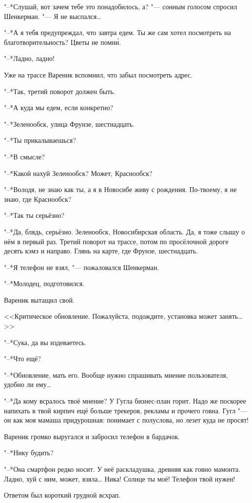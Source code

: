 "--*Слушай, вот зачем тебе это понадобилось, а? "--- сонным голосом спросил Шенкерман.
"--- Я не выспался\dots{}

"--*А я тебя предупреждал, что завтра едем.
Ты же сам хотел посмотреть на благотворительность?
Цветы не помн\'и.

"--*Ладно, ладно!

Уже на трассе Вареник вспомнил, что забыл посмотреть адрес.

"--*Так, третий поворот должен быть.

"--*А куда мы едем, если конкретно?

"--*Зеленообск, улица Фрунзе, шестнадцать.

"--*Ты прикалываешься?

"--*В смысле?

"--*Какой нахуй Зеленообск?
Может, Краснообск?

"--*Володя, не знаю как ты, а я в Новосибе живу с рождения.
По-твоему, я не знаю, где Краснообск?

"--*Так ты серьёзно?

"--*Да, блядь, серьёзно.
Зеленообск, Новосибирская область.
Да, я тоже слышу о нём в первый раз.
Третий поворот на трассе, потом по просёлочной дороге десять кэмэ и направо.
Глянь на карте, где Фрунзе, шестнадцать.

"--*Я телефон не взял, "--- пожаловался Шенкерман.

"--*Молодец, подготовился.

Вареник вытащил свой.

<<Критическое обновление.
Пожалуйста, подождите, установка может занять\dots>>

"--*Сука, да вы издеваетесь.

"--*Что ещё?

"--*Обновление, мать его.
Вообще нужно спрашивать мнение пользователя, удобно ли ему\dots{}

"--*Да кому всралось твоё мнение?
У Гугла бизнес-план горит.
Надо же поскорее напихать в твой кирпич ещё больше трекеров, рекламы и прочего говна.
Гугл "--- он как моя мамаша придурошная: понимает с полуслова, но лезет куда не просят!

Вареник громко выругался и забросил телефон в бардачок.

"--*Нику будить?

"--*Она смартфон редко носит.
У неё раскладушка, древняя как говно мамонта.
Ладно, хуй с ним, может, взяла\dots{}
Ника!
Солнце ты моё!
Телефон твой нужен!

Ответом был короткий грудной всхрап.

